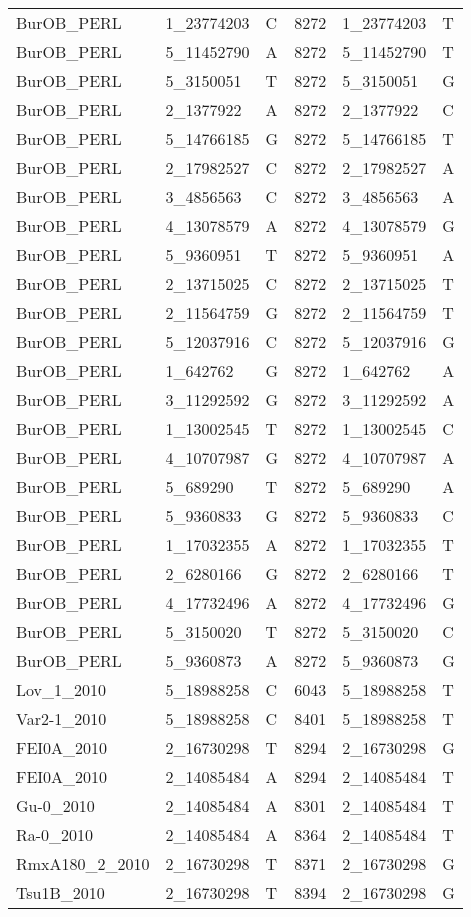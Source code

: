 \begin{center}
\begin{longtable}{|l|l|l|l|l|l|}
BurOB\_PERL&1\_23774203&C&8272&1\_23774203&T\\
BurOB\_PERL&5\_11452790&A&8272&5\_11452790&T\\
BurOB\_PERL&5\_3150051&T&8272&5\_3150051&G\\
BurOB\_PERL&2\_1377922&A&8272&2\_1377922&C\\
BurOB\_PERL&5\_14766185&G&8272&5\_14766185&T\\
BurOB\_PERL&2\_17982527&C&8272&2\_17982527&A\\
BurOB\_PERL&3\_4856563&C&8272&3\_4856563&A\\
BurOB\_PERL&4\_13078579&A&8272&4\_13078579&G\\
BurOB\_PERL&5\_9360951&T&8272&5\_9360951&A\\
BurOB\_PERL&2\_13715025&C&8272&2\_13715025&T\\
BurOB\_PERL&2\_11564759&G&8272&2\_11564759&T\\
BurOB\_PERL&5\_12037916&C&8272&5\_12037916&G\\
BurOB\_PERL&1\_642762&G&8272&1\_642762&A\\
BurOB\_PERL&3\_11292592&G&8272&3\_11292592&A\\
BurOB\_PERL&1\_13002545&T&8272&1\_13002545&C\\
BurOB\_PERL&4\_10707987&G&8272&4\_10707987&A\\
BurOB\_PERL&5\_689290&T&8272&5\_689290&A\\
BurOB\_PERL&5\_9360833&G&8272&5\_9360833&C\\
BurOB\_PERL&1\_17032355&A&8272&1\_17032355&T\\
BurOB\_PERL&2\_6280166&G&8272&2\_6280166&T\\
BurOB\_PERL&4\_17732496&A&8272&4\_17732496&G\\
BurOB\_PERL&5\_3150020&T&8272&5\_3150020&C\\
BurOB\_PERL&5\_9360873&A&8272&5\_9360873&G\\
Lov\_1\_2010&5\_18988258&C&6043&5\_18988258&T\\
Var2-1\_2010&5\_18988258&C&8401&5\_18988258&T\\
FEI0A\_2010&2\_16730298&T&8294&2\_16730298&G\\
FEI0A\_2010&2\_14085484&A&8294&2\_14085484&T\\
Gu-0\_2010&2\_14085484&A&8301&2\_14085484&T\\
Ra-0\_2010&2\_14085484&A&8364&2\_14085484&T\\
RmxA180\_2\_2010&2\_16730298&T&8371&2\_16730298&G\\
Tsu1B\_2010&2\_16730298&T&8394&2\_16730298&G\\

\end{longtable}
\end{center}
